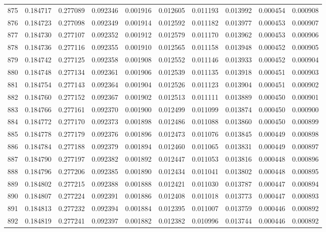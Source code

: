 \begin{tabular}{lrrrrrrrrr}
875 & 0.184717 & 0.277089 & 0.092346 & 0.001916 & 0.012605 & 0.011193 & 0.013992 & 0.000454 & 0.000908 \\
876 & 0.184723 & 0.277098 & 0.092349 & 0.001914 & 0.012592 & 0.011182 & 0.013977 & 0.000453 & 0.000907 \\
877 & 0.184730 & 0.277107 & 0.092352 & 0.001912 & 0.012579 & 0.011170 & 0.013962 & 0.000453 & 0.000906 \\
878 & 0.184736 & 0.277116 & 0.092355 & 0.001910 & 0.012565 & 0.011158 & 0.013948 & 0.000452 & 0.000905 \\
879 & 0.184742 & 0.277125 & 0.092358 & 0.001908 & 0.012552 & 0.011146 & 0.013933 & 0.000452 & 0.000904 \\
880 & 0.184748 & 0.277134 & 0.092361 & 0.001906 & 0.012539 & 0.011135 & 0.013918 & 0.000451 & 0.000903 \\
881 & 0.184754 & 0.277143 & 0.092364 & 0.001904 & 0.012526 & 0.011123 & 0.013904 & 0.000451 & 0.000902 \\
882 & 0.184760 & 0.277152 & 0.092367 & 0.001902 & 0.012513 & 0.011111 & 0.013889 & 0.000450 & 0.000901 \\
883 & 0.184766 & 0.277161 & 0.092370 & 0.001900 & 0.012499 & 0.011099 & 0.013874 & 0.000450 & 0.000900 \\
884 & 0.184772 & 0.277170 & 0.092373 & 0.001898 & 0.012486 & 0.011088 & 0.013860 & 0.000450 & 0.000899 \\
885 & 0.184778 & 0.277179 & 0.092376 & 0.001896 & 0.012473 & 0.011076 & 0.013845 & 0.000449 & 0.000898 \\
886 & 0.184784 & 0.277188 & 0.092379 & 0.001894 & 0.012460 & 0.011065 & 0.013831 & 0.000449 & 0.000897 \\
887 & 0.184790 & 0.277197 & 0.092382 & 0.001892 & 0.012447 & 0.011053 & 0.013816 & 0.000448 & 0.000896 \\
888 & 0.184796 & 0.277206 & 0.092385 & 0.001890 & 0.012434 & 0.011041 & 0.013802 & 0.000448 & 0.000895 \\
889 & 0.184802 & 0.277215 & 0.092388 & 0.001888 & 0.012421 & 0.011030 & 0.013787 & 0.000447 & 0.000894 \\
890 & 0.184807 & 0.277224 & 0.092391 & 0.001886 & 0.012408 & 0.011018 & 0.013773 & 0.000447 & 0.000893 \\
891 & 0.184813 & 0.277232 & 0.092394 & 0.001884 & 0.012395 & 0.011007 & 0.013759 & 0.000446 & 0.000892 \\
892 & 0.184819 & 0.277241 & 0.092397 & 0.001882 & 0.012382 & 0.010996 & 0.013744 & 0.000446 & 0.000892 \\

\end{tabular}
